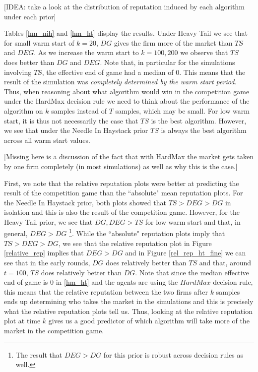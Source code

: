 \documentclass{article}
\theoremstyle{definition}
\begin{document}
[IDEA: take a look at the distribution of reputation induced by each algorithm under each prior]

Tables \ref{hm_nih} and \ref{hm_ht} display the results. Under Heavy Tail we see that for small warm start of $k = 20$, $DG$ gives the firm more of the market than $TS$ and $DEG$. As we increase the warm start to $k = 100, 200$ we observe that $TS$ does better than $DG$ and $DEG$. Note that, in particular for the simulations involving $TS$, the effective end of game had a median of 0. This means that the result of the simulation was \textit{completely determined by the warm start period}. Thus, when reasoning about what algorithm would win in the competition game under the HardMax decision rule we need to think about the performance of the algorithm on $k$ samples instead of $T$ samples, which may be small. For low warm start, it is thus not necessarily the case that $TS$ is the best algorithm. However, we see that under the Needle In Haystack prior $TS$ is always the best algorithm across all warm start values.

[Missing here is a discussion of the fact that with HardMax the market gets taken by one firm completely (in most simulations) as well as why this is the case.]

First, we note that the relative reputation plots were better at predicting the result of the competition game than the ``absolute" mean reputation plots. For the Needle In Haystack prior, both plots showed that $TS > DEG > DG$ in isolation and this is also the result of the competition game. However, for the Heavy Tail prior, we see that $DG, DEG > TS$ for low warm start and that, in general, $DEG > DG$ \footnote{The result that $DEG > DG$ for this prior is robust across decision rules as well.}. While the ``absolute" reputation plots imply that $TS > DEG > DG$, we see that the relative reputation plot in Figure \ref{relative_rep} implies that $DEG > DG$ and in Figure \ref{rel_rep_ht_fine} we can see that in the early rounds, $DG$ does relatively better than $TS$ and that, around $t = 100$, $TS$ does relatively better than $DG$. Note that since the median effective end of game is $0$ in \ref{hm_ht} and the agents are using the $HardMax$ decision rule, this means that the relative reputation between the two firms after $k$ samples ends up determining who takes the market in the simulations and this is precisely what the relative reputation plots tell us. Thus, looking at the relative reputation plot at time $k$ gives us a good predictor of which algorithm will take more of the market in the competition game.
\end{document}
